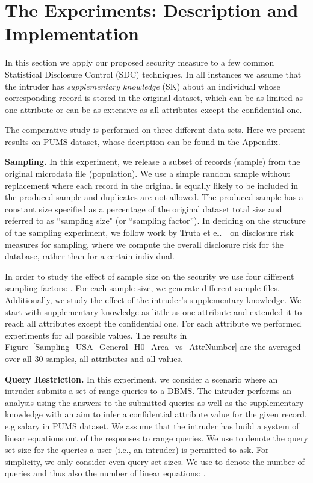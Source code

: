 \documentclass{llncs}
\begin{document}
\section{The Experiments: Description and Implementation}
In this section we apply our proposed security measure to a few
common Statistical Disclosure Control (SDC) techniques. In all
instances we assume that the intruder has \emph{supplementary
knowledge} (SK) about an individual whose corresponding record is
stored in the original dataset, which  can be as limited as one
attribute or can be as extensive as all attributes except the
confidential one.


The comparative study is performed on three different data sets.
Here we present results on PUMS dataset, whose decription can be found in the Appendix.


\textbf{Sampling.} In this experiment, we release a subset of records (sample) from
the original microdata file (population). We use a simple random
sample without replacement where each record in the original is
equally likely to be included in the produced sample and
duplicates are not allowed. The produced sample has a constant
size specified as a percentage of the original dataset total size
and referred to as ``sampling size" (or ``sampling factor''). In deciding on the
structure of the sampling experiment, we follow work by Truta et
el.~\cite{Truta-Fotouhi:Disclosure04}~on disclosure risk measures
for sampling, where we compute the overall disclosure risk for the
database, rather than for a certain
individual.


In order to study the effect of sample size on the security we use
four different sampling factors: . For each
sample size, we generate  different sample files.
Additionally, we study the effect of the intruder's supplementary
knowledge. We start with supplementary knowledge as little as one
attribute and extended it to reach all attributes except the
confidential one. For each attribute we performed experiments for
all possible values. The results in
Figure~\ref{Sampling_USA_General_H0_Area_vs_AttrNumber} are the
averaged over all 30 samples, all attributes and all values.

\textbf{Query Restriction.} In this experiment, we consider a scenario where an intruder
submits a set of range queries to a DBMS. The intruder performs an
analysis using the answers to the submitted queries as well as the
supplementary knowledge with an aim to infer a confidential
attribute value for the given record, e.g salary in PUMS dataset.
We assume that the intruder has build a system of linear equations
out of the responses to range queries. We use  to denote the
query set size for the queries a user (i.e., an intruder) is
permitted to ask. For simplicity, we only consider
even query set sizes. We use  to denote the number of queries
and thus also the number of linear equations: .
\end{document}
